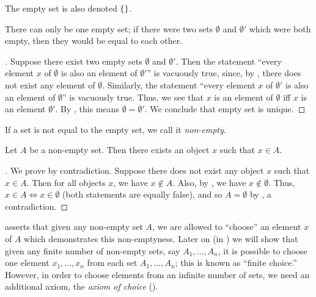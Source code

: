 \begin{note}
  The empty set is also denoted \(\left\lbrace\right\rbrace\).
\end{note}

\begin{ac}\label{i:ac:3.1.2}
  There can only be one empty set;
  if there were two sets \(\emptyset\) and \(\emptyset'\) which were both empty, then they would be equal to each other.
\end{ac}

\begin{proof}[]
  Suppose there exist two empty sets \(\emptyset\) and \(\emptyset'\).
  Then the statement ``every element \(x\) of \(\emptyset\) is also an element of \(\emptyset'\)'' is vacuously true, since, by , there does not exist any element of \(\emptyset\).
  Similarly, the statement ``every element \(x\) of \(\emptyset'\) is also an element of \(\emptyset\)'' is vacuously true.
  Thus, we see that \(x\) is an element of \(\emptyset\) iff \(x\) is an element \(\emptyset'\).
  By , this means \(\emptyset = \emptyset'\).
  We conclude that empty set is unique.
\end{proof}

\begin{note}
  If a set is not equal to the empty set, we call it \emph{non-empty}.
\end{note}

\setcounter{thm}{5}
\begin{lem}\label{i:3.1.6}
  Let \(A\) be a non-empty set.
  Then there exists an object \(x\) such that \(x \in A\).
\end{lem}

\begin{proof}[]
  We prove by contradiction.
  Suppose there does not exist any object \(x\) such that \(x \in A\).
  Then for all objects \(x\), we have \(x \notin A\).
  Also, by , we have \(x \notin \emptyset\).
  Thus, \(x \in A \iff x \in \emptyset\) (both statements are equally false), and so \(A = \emptyset\) by , a contradiction.
\end{proof}

\begin{rmk}\label{i:3.1.7}
   asserts that given any non-empty set \(A\), we are allowed to ``choose'' an element \(x\) of \(A\) which demonstrates this non-emptyness.
  Later on (in ) we will show that given any finite number of non-empty sets, say \(A_1, \dots, A_n\), it is possible to choose one element \(x_1, \dots, x_n\) from each set \(A_1, \dots, A_n\);
  this is known as ``finite choice.''
  However, in order to choose elements from an infinite number of sets, we need an additional axiom, the \emph{axiom of choice} ().
\end{rmk}

